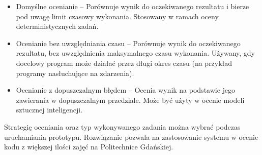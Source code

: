 \begin{itemize}
    \item Domyślne ocenianie -- Porównuje wynik do oczekiwanego rezultatu i bierze pod uwagę limit czasowy wykonania. Stosowany w ramach oceny deterministycznych zadań.
    \item Ocenianie bez uwzględniania czasu -- Porównuje wynik do oczekiwanego rezultatu, bez uwzględnienia maksymalnego czasu wykonania. Używany, gdy docelowy program może działać przez długi okres czasu (na przykład programy nasłuchujące na zdarzenia).
    \item Ocenianie z dopuszczalnym błędem -- Ocenia wynik na podstawie jego zawierania w dopuszczalnym przedziale. Może być użyty w ocenie modeli sztucznej inteligencji.
\end{itemize}
Strategię oceniania oraz typ wykonywanego zadania można wybrać podczas uruchamiania prototypu. Rozwiązanie pozwala na zastosowanie systemu w ocenie kodu z większej ilości zajęć na Politechnice Gdańskiej.